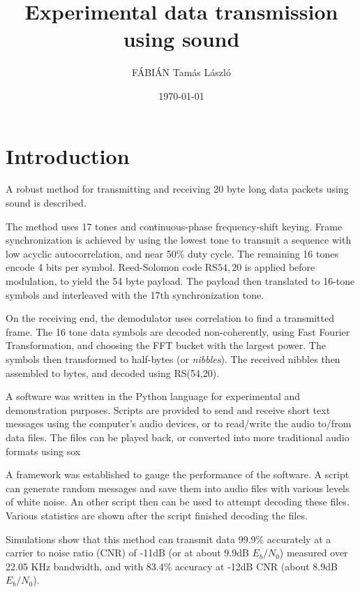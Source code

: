 \documentclass[a4paper]{article}
\title{Experimental data transmission using sound}
\author{FÁBIÁN Tamás László}
\date{\today}
\begin{document}
\maketitle

\section{Introduction}
\label{sec:introduction}

A robust method for transmitting and receiving 20 byte long data 
packets using sound is described.

The method uses 17 tones and continuous-phase frequency-shift keying. 
Frame synchronization is achieved by using the lowest tone to transmit 
a sequence with low acyclic autocorrelation, and near 50\% duty cycle. 
The remaining 16 tones encode 4 bits per symbol. Reed-Solomon code 
RS\(54,20\) is applied before modulation, to yield the 54 byte payload. 
The payload then translated to 16-tone symbols and interleaved with the 
17th synchronization tone.

On the receiving end, the demodulator uses correlation to find a 
transmitted frame. The 16 tone data symbols are decoded non-coherently, 
using Fast Fourier Transformation, and choosing the FFT bucket with the 
largest power. The symbols then transformed to half-bytes (or 
\textit{nibbles}). The received nibbles then assembled to bytes, and 
decoded using RS(54,20).

A software was written in the Python language for experimental and 
demonstration purposes. Scripts are provided to send and receive short 
text messages using the computer's audio devices, or to read/write the 
audio to/from data files. The files can be played back, or converted 
into more traditional audio formats using sox\cite{sox1}

A framework was established to gauge the performance of the software. A 
script can generate random messages and save them into audio files with 
various levels of white noise. An other script then can be used to 
attempt decoding these files. Various statistics are shown after the 
script finished decoding the files.

Simulations show that this method can transmit data 99.9\% accurately 
at a carrier to noise ratio (CNR) of -11dB (or at about 9.9dB 
$E_b/N_0$) measured over 22.05 KHz bandwidth, and with 83.4\% accuracy 
at -12dB CNR (about 8.9dB $E_b/N_0$).
\end{document}
